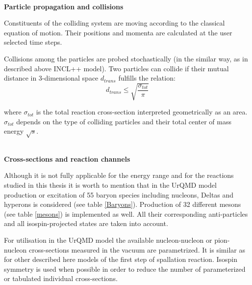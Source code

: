 






 \ \\
\textbf{Particle propagation and collisions}

Constituents of the colliding system are moving according to the classical equation of motion. Their positions and momenta are calculated  at the user selected time steps.

Collisions among the particles are probed stochastically (in the similar way, as in described above INCL++ model).
Two particles can collide if their mutual distance in 3-dimensional space $d_{trans}$ fulfills the relation: 
\begin{equation}
    d_{trans} \leq \sqrt{\frac{\sigma_{tot}}{\pi}}
\end{equation}

where $\sigma_{tot}$ is the total reaction cross-section interpreted geometrically as an area. 
$\sigma_{tot}$ depends on the type of colliding particles and their total center of mass energy $\sqrt{s}$.

 \ \\
\textbf{Cross-sections and reaction channels} 

Although it is not fully applicable for the energy range and for the reactions studied in this thesis it is worth to mention that 
in the UrQMD model production or excitation of 
55 baryon species including nucleons, Deltas and hyperons is considered (see table \ref{Baryons}). Production of 32 different mesons (see table \ref{mesons}) is implemented as well.  
All their corresponding anti-particles and all isospin-projected states are taken into account.

For utilisation in the UrQMD model the available nucleon-nucleon or pion-nucleon cross-sections measured in the vacuum are parametrized. It is similar as for other described here models of the first step of spallation reaction.
Isospin symmetry is used when possible in order to reduce the number 
of parameterized or tabulated individual cross-sections.



